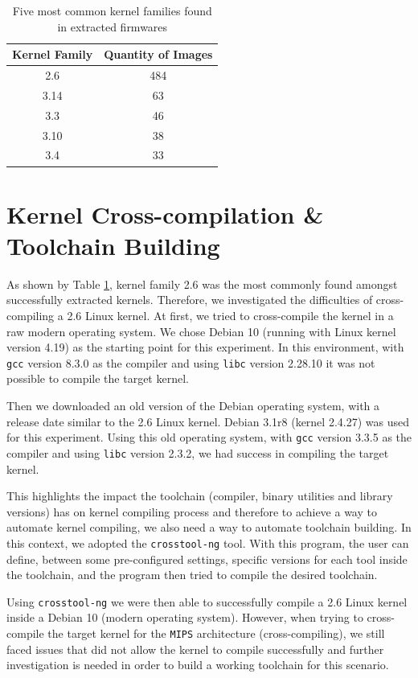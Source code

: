 \begin{table}[h]
\centering
\caption{Five most common kernel families found in extracted firmwares}
\begin{tabular}{|c|c|}
\hline
\textbf{Kernel Family} & \textbf{Quantity of Images} \\ \hline
2.6                    & 484               \\ \hline
3.14                   & 63                \\ \hline
3.3                    & 46                \\ \hline
3.10                   & 38                \\ \hline
3.4                    & 33                \\ \hline
\end{tabular}
\label{tab:kernel-family-stats}
\end{table}


\section{Kernel Cross-compilation \& Toolchain Building}

As shown by Table \ref{tab:kernel-family-stats}, kernel family 2.6 was the most commonly found amongst successfully extracted kernels. Therefore, we investigated the difficulties of cross-compiling a 2.6 Linux kernel. At first, we tried to cross-compile the kernel in a raw modern operating system. We chose Debian 10 (running with Linux kernel version 4.19) as the starting point for this experiment. In this environment, with {\tt gcc} version 8.3.0 as the compiler and using {\tt libc} version 2.28.10 it was not possible to compile the target kernel.

Then we downloaded an old version of the Debian operating system, with a release date similar to the 2.6 Linux kernel. Debian 3.1r8 (kernel 2.4.27) was used for this experiment. Using this old operating system, with {\tt gcc} version 3.3.5 as the compiler and using {\tt libc} version 2.3.2, we had success in compiling the target kernel.

This highlights the impact the toolchain (compiler, binary utilities and library versions) has on kernel compiling process and therefore to achieve a way to automate kernel compiling, we also need a way to automate toolchain building. In this context, we adopted the {\tt crosstool-ng} tool. With this program, the user can define, between some pre-configured settings, specific versions for each tool inside the toolchain, and the program then tried to compile the desired toolchain.

Using {\tt crosstool-ng} we were then able to successfully compile a 2.6 Linux kernel inside a Debian 10 (modern operating system). However, when trying to cross-compile the target kernel for the {\tt MIPS} architecture (cross-compiling), we still faced issues that did not allow the kernel to compile successfully and further investigation is needed in order to build a working toolchain for this scenario.